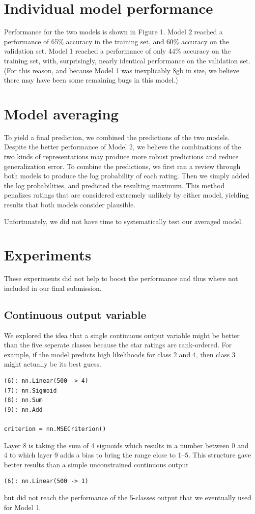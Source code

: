 \documentclass{article} %
\begin{document}
\section{Individual model performance}
Performance for the two models is shown in Figure 1.   Model 2 reached a performance of 65\% accuracy in the training set,
and 60\% accuracy on the validation set. Model 1 reached a performance
of only 44\% accuracy on the training set, with, surprisingly, nearly
identical performance on the validation set. (For this reason, and
because Model 1 was inexplicably 8gb in size, we believe there may
have been some remaining bugs in this model.)


\section{Model averaging}
To yield a final prediction, we combined the predictions of the two
models. Despite the better performance of Model 2, we believe the
combinations of the two kinds of representations may produce more
robust predictions and reduce generalization error. To combine the
predictions, we first ran a review through both models to produce the
log probability of each rating. Then we simply added the log
probabilities, and predicted the resulting maximum. This method
penalizes ratings that are considered extremely unlikely by either
model, yielding results that both models consider plausible.

Unfortunately, we did not have time to systematically test our
averaged model.

\section{Experiments}


These experiments did not help to boost the performance and thus where not included in our final submission.

\subsection{Continuous output variable}
We explored the idea that a single continuous output variable might be better than the five seperate classes because the star ratings are rank-ordered. 
For example, if the model predicts high likelihoods for class 2 and 4, then class 3 might actually be its best guess.
\begin{verbatim}
(6): nn.Linear(500 -> 4)
(7): nn.Sigmoid
(8): nn.Sum
(9): nn.Add

criterion = nn.MSECriterion()
\end{verbatim}
Layer 8 is taking the sum of 4 sigmoids which results in a number between 0 and 4 to which layer 9 adds a bias to bring the range close to 1--5.
This structure gave better results than a simple unconstrained continuous output 
\begin{verbatim}
(6): nn.Linear(500 -> 1)
\end{verbatim}
but did not reach the performance of the 5-classes output that we eventually used for Model 1.
\end{document}
